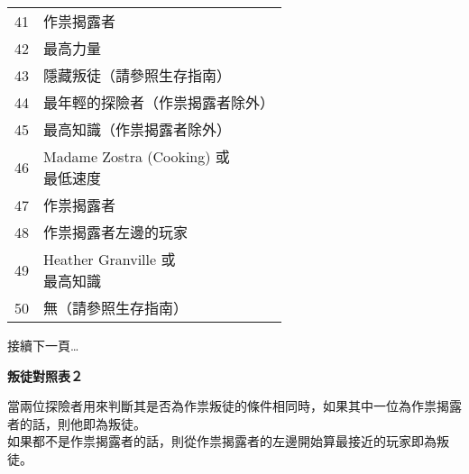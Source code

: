 \begin{center}
\begin{minipage}[t]{.45\textwidth}
\begin{tabular}[t]{ c l }
			41             & 作祟揭露者                                     \\
			42             & 最高力量                                      \\
			43             & 隱藏叛徒（請參照生存指南）                             \\
			44             & 最年輕的探險者（作祟揭露者除外）                          \\
			45             & 最高知識（作祟揭露者除外）                             \\

			46             & \makecell[tl]{Madame Zostra (Cooking) 或   \\ 最低速度} \\
			47             & 作祟揭露者                                     \\
			48             & 作祟揭露者左邊的玩家                                \\
			49             & \makecell[tl]{Heather Granville 或         \\ 最高知識} \\
			50             & 無（請參照生存指南）                                \\
		\end{tabular}
	\end{minipage}
\end{center}

\vfill\hfill 接續下一頁…
\pagebreak

\begin{center}
	\Huge\bfseries 叛徒對照表２
\end{center}
當兩位探險者用來判斷其是否為作祟叛徒的條件相同時，如果其中一位為作祟揭露者的話，則他即為叛徒。 \\
如果都不是作祟揭露者的話，則從作祟揭露者的左邊開始算最接近的玩家即為叛徒。

